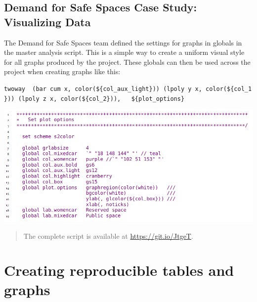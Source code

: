 \documentclass[
]{book}
\begin{document}
\begin{ex}
\hypertarget{demand-for-safe-spaces-case-study-visualizing-data}{%
\subsection{Demand for Safe Spaces Case Study: Visualizing Data}\label{demand-for-safe-spaces-case-study-visualizing-data}}

The Demand for Safe Spaces team defined the settings for graphs in globals in the master analysis script. This is a simple way to create a uniform visual style for all graphs produced by the project. These globals can then be used across the project when creating graphs like this:

\texttt{twoway\ \ (bar\ cum\ x,\ color(\$\{col\_aux\_light\}))\ (lpoly\ y\ x,\ color(\$\{col\_1\}))\ (lpoly\ z\ x,\ color(\$\{col\_2\})),\ \ \ \$\{plot\_options\}}

\includegraphics{examples/ch6-visualizing-data.png}

\begin{quote}
The complete script is available at \url{https://git.io/JtgeT}.
\end{quote}
\end{ex}

\hypertarget{creating-reproducible-tables-and-graphs}{%
\section*{Creating reproducible tables and graphs}\label{creating-reproducible-tables-and-graphs}}
\end{document}
